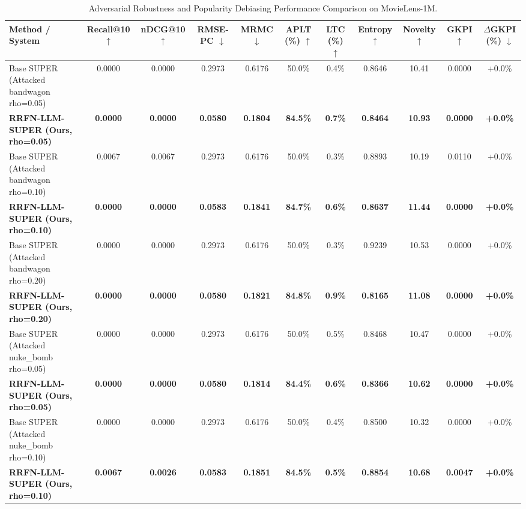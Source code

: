 \begin{table}[t]
\centering
\small
\caption{Adversarial Robustness and Popularity Debiasing Performance Comparison on MovieLens-1M.}
\label{tab:benchmark_results}
\begin{tabular}{lcccccccccc}
\toprule
\textbf{Method / System} & \textbf{Recall@10} $\uparrow$ & \textbf{nDCG@10} $\uparrow$ & \textbf{RMSE-PC} $\downarrow$ & \textbf{MRMC} $\downarrow$ & \textbf{APLT} (\%) $\uparrow$ & \textbf{LTC} (\%) $\uparrow$ & \textbf{Entropy} $\uparrow$ & \textbf{Novelty} $\uparrow$ & \textbf{GKPI} $\uparrow$ & \textbf{$\Delta$GKPI} (\%) $\downarrow$ \\
\midrule
Base SUPER (Attacked bandwagon rho=0.05) & 0.0000 & 0.0000 & 0.2973 & 0.6176 & 50.0\% & 0.4\% & 0.8646 & 10.41 & 0.0000 & +0.0\% \\
\textbf{RRFN-LLM-SUPER (Ours, rho=0.05)} & \textbf{0.0000} & \textbf{0.0000} & \textbf{0.0580} & \textbf{0.1804} & \textbf{84.5\%} & \textbf{0.7\%} & \textbf{0.8464} & \textbf{10.93} & \textbf{0.0000} & \textbf{+0.0\%} \\
Base SUPER (Attacked bandwagon rho=0.10) & 0.0067 & 0.0067 & 0.2973 & 0.6176 & 50.0\% & 0.3\% & 0.8893 & 10.19 & 0.0110 & +0.0\% \\
\textbf{RRFN-LLM-SUPER (Ours, rho=0.10)} & \textbf{0.0000} & \textbf{0.0000} & \textbf{0.0583} & \textbf{0.1841} & \textbf{84.7\%} & \textbf{0.6\%} & \textbf{0.8637} & \textbf{11.44} & \textbf{0.0000} & \textbf{+0.0\%} \\
Base SUPER (Attacked bandwagon rho=0.20) & 0.0000 & 0.0000 & 0.2973 & 0.6176 & 50.0\% & 0.3\% & 0.9239 & 10.53 & 0.0000 & +0.0\% \\
\textbf{RRFN-LLM-SUPER (Ours, rho=0.20)} & \textbf{0.0000} & \textbf{0.0000} & \textbf{0.0580} & \textbf{0.1821} & \textbf{84.8\%} & \textbf{0.9\%} & \textbf{0.8165} & \textbf{11.08} & \textbf{0.0000} & \textbf{+0.0\%} \\
Base SUPER (Attacked nuke_bomb rho=0.05) & 0.0000 & 0.0000 & 0.2973 & 0.6176 & 50.0\% & 0.5\% & 0.8468 & 10.47 & 0.0000 & +0.0\% \\
\textbf{RRFN-LLM-SUPER (Ours, rho=0.05)} & \textbf{0.0000} & \textbf{0.0000} & \textbf{0.0580} & \textbf{0.1814} & \textbf{84.4\%} & \textbf{0.6\%} & \textbf{0.8366} & \textbf{10.62} & \textbf{0.0000} & \textbf{+0.0\%} \\
Base SUPER (Attacked nuke_bomb rho=0.10) & 0.0000 & 0.0000 & 0.2973 & 0.6176 & 50.0\% & 0.4\% & 0.8500 & 10.32 & 0.0000 & +0.0\% \\
\textbf{RRFN-LLM-SUPER (Ours, rho=0.10)} & \textbf{0.0067} & \textbf{0.0026} & \textbf{0.0583} & \textbf{0.1851} & \textbf{84.5\%} & \textbf{0.5\%} & \textbf{0.8854} & \textbf{10.68} & \textbf{0.0047} & \textbf{+0.0\%} \\

\end{tabular}
\end{table}
